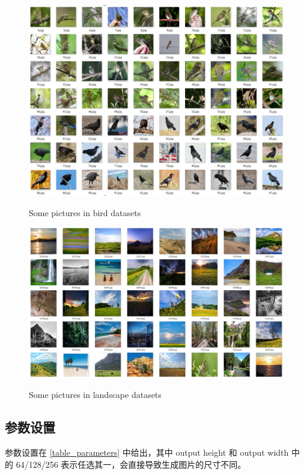 \documentclass{article}
\begin{document}
\begin{CJK*}{UTF8}{gbsn}
	\begin{figure}[htbp]
		\begin{minipage}{0.5\linewidth}
			\label{fig_bird}
			\centering\includegraphics[scale=0.15]{res/bird.png}
			\caption{Some pictures in bird datasets}
		\end{minipage}
		\begin{minipage}{0.5\linewidth}
			\label{fig_landscape}
			\centering\includegraphics[scale=0.15]{res/landscape.png}
			\caption{Some pictures in landscape datasets}
		\end{minipage}
	\end{figure}
	
	
  \subsection{参数设置}
    
    参数设置在 \ref{table_parameters} 中给出，其中 output height 和 output width 中的 64/128/256 表示任选其一，会直接导致生成图片的尺寸不同。
    

\end{CJK*}
\end{document}
